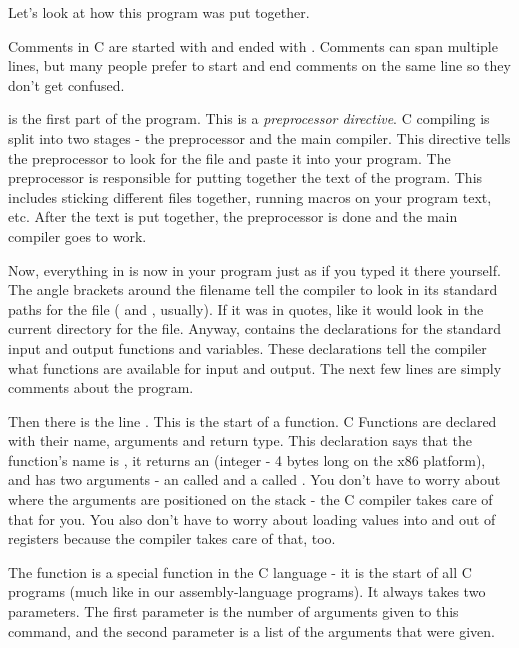 Let's look at how this program was put together.

Comments in C are started with \icode{/*} and ended with
\icode{*/}.  Comments can span multiple lines, but 
many people prefer to start and end comments on the same line
so they don't get confused.

 is the first part of
the program.  This is a \emph{preprocessor directive}.
C compiling is split into two stages - the preprocessor and the
main compiler.  This directive tells the preprocessor to look
for the file  and paste it into
your program.  The preprocessor is responsible for putting together the
text of the program.  This includes sticking different files together, running
macros on your program text, etc.  After the text is put together, the 
preprocessor is done and the main compiler goes to work.

Now, everything in  is
now in your program just as if you typed it there yourself.  The angle brackets
around the filename tell the compiler to look in its standard
paths for the file ( and 
, usually).  If it was
in quotes, like  it would
look in the current directory for the file.  Anyway, 
 contains the declarations for 
the standard input and output functions and variables.   These
declarations tell the
compiler what functions are available for input and output.  The next few
lines are simply comments about the program.

Then there is the line .
This is the start of a function.  C Functions are declared with their 
name, arguments and return type.  This declaration says that the function's
name is , it returns an  
(integer - 4 bytes long on the x86 platform), and has two arguments - 
an  called
 and a  called 
.  You don't have to worry about where the arguments
are positioned on the stack - the C compiler takes care of that for you.
You also don't have to worry about loading values into and out of registers
because the compiler takes care of that, too.

The  function is a special function in the
C language - it is the
start of all C programs (much like  in our
assembly-language programs).  It always takes two parameters.  The first 
parameter is the number of arguments given to this command, and the
second parameter is a list of the arguments that were given.

